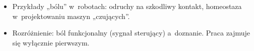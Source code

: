 \begin{planroboczy}[ok. 1 s.]
\begin{itemize}
  \item Przykłady „bólu” w~robotach: odruchy na szkodliwy kontakt, homeostaza w~projektowaniu maszyn „czujących”.
  \item Rozróżnienie: ból funkcjonalny (sygnał sterujący) a~doznanie. Praca zajmuje się wyłącznie pierwszym.
\end{itemize}

\end{planroboczy}
